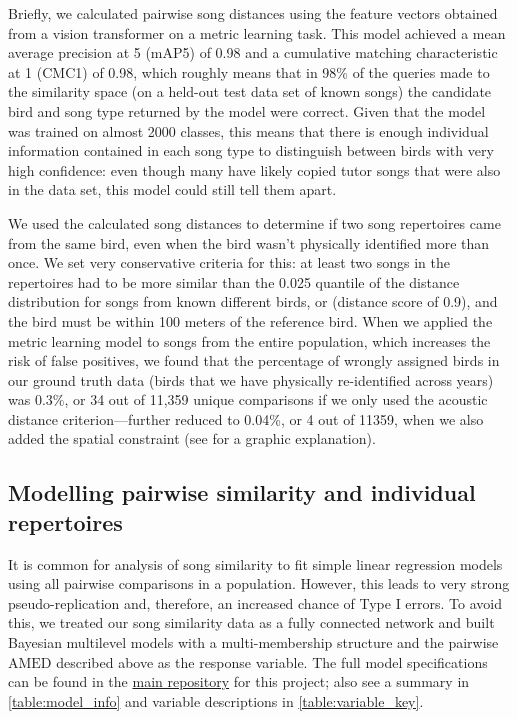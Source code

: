 \documentclass[9pt, onecolumn, twoside, lineno]{gsajnl}
\begin{document}
Briefly, we calculated pairwise song distances using the feature vectors obtained from a vision transformer on a metric learning task. This model achieved a mean average precision at 5 (mAP\@5) of 0.98 and a cumulative matching characteristic at 1 (CMC\@1) of 0.98, which roughly means that in 98\% of the queries made to the similarity space (on a held-out test data set of known songs) the candidate bird and song type returned by the model were correct. Given that the model was trained on almost 2000 classes, this means that there is enough individual information contained in each song type to distinguish between birds with very high confidence: even though many have likely copied tutor songs that were also in the data set, this model could still tell them apart.

We used the calculated song distances to determine if two song repertoires came from the same bird, even when the bird wasn't physically identified more than once. We set very conservative criteria for this: at least two songs in the repertoires had to be more similar than the 0.025 quantile of the distance distribution for songs from known different birds, or (distance score of 0.9), and the bird must be within 100 meters of the reference bird. When we applied the metric learning model to songs from the entire population, which increases the risk of false positives, we found that the percentage of wrongly assigned birds in our ground truth data (birds that we have physically re-identified across years) was 0.3\%, or 34 out of 11,359 unique comparisons if we only used the acoustic distance criterion---further reduced to 0.04\%, or 4 out of 11359, when we also added the spatial constraint (see  for a graphic explanation).

\subsection{Modelling pairwise similarity and individual repertoires}

It is common for analysis of song similarity to fit simple linear regression models using all pairwise comparisons in a population. However, this leads to very strong pseudo-replication and, therefore, an increased chance of Type I errors. To avoid this, we treated our song similarity data as a fully connected network and built Bayesian multilevel models with a multi-membership structure and the pairwise $\text{AMED}$ described above as the response variable. The full model specifications can be found in the \href{https://github.com/nilomr/birdsong-demography}{main repository} for this project; also see a summary in \autoref{table:model_info} and variable descriptions in \autoref{table:variable_key}.
\end{document}
